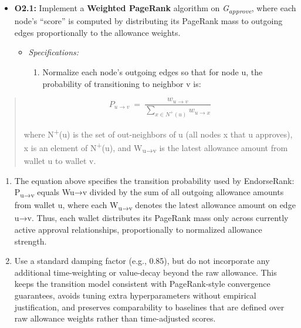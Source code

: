 \documentclass[
]{article}
\begin{document}
\begin{itemize}
\item
  \textbf{O2.1:} Implement a \textbf{Weighted PageRank} algorithm on \emph{G\textsubscript{approve}}, where each node's ``score'' is computed by distributing its PageRank mass to outgoing edges proportionally to the allowance weights.

  \begin{itemize}
  \item
    \emph{Specifications:}

    \begin{enumerate}
    \def\labelenumi{(\alph{enumi})}
    \item
      Normalize each node's outgoing edges so that for node u, the probability of transitioning to neighbor v is:
    \end{enumerate}
  \end{itemize}
\end{itemize}

\begin{quote}
\[P_{u \rightarrow v}\  = \ \frac{w_{u \rightarrow v}}{\sum_{x \in N^{+}(u)}^{}w_{u \rightarrow x}}\]

where N\textsuperscript{+}(u) is the set of out-neighbors of u (all nodes x that u approves), x is an element of N\textsuperscript{+}(u), and W\textsubscript{u→v} is the latest allowance amount from wallet u to wallet v.
\end{quote}

\begin{enumerate}
\def\labelenumi{(\alph{enumi})}
\setcounter{enumi}{1}
\item
  The equation above specifies the transition probability used by EndorseRank: P\textsubscript{u→v} equals Wu→v divided by the sum of all outgoing allowance amounts from wallet u, where each W\textsubscript{u→v} denotes the latest allowance amount on edge u→v. Thus, each wallet distributes its PageRank mass only across currently active approval relationships, proportionally to normalized allowance strength.
\item
  Use a standard damping factor (e.g., 0.85), but do not incorporate any additional time-weighting or value-decay beyond the raw allowance. This keeps the transition model consistent with PageRank-style convergence guarantees, avoids tuning extra hyperparameters without empirical justification, and preserves comparability to baselines that are defined over raw allowance weights rather than time-adjusted scores.
\end{enumerate}
\end{document}
